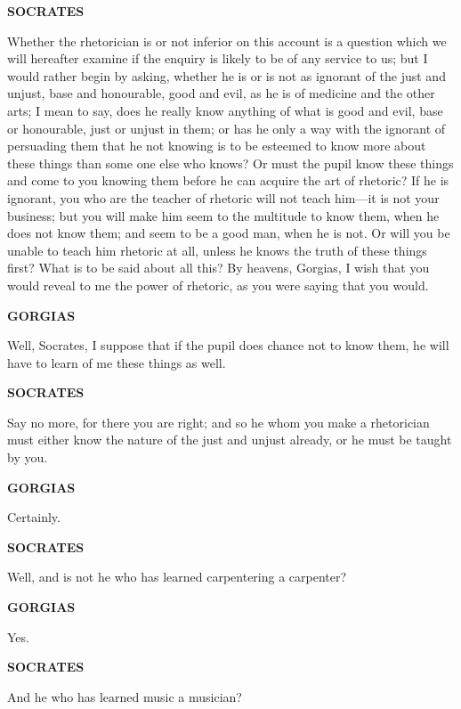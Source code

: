 \documentclass[11pt,letter]{article}
\begin{document}
\par \textbf{SOCRATES}
\par   Whether the rhetorician is or not inferior on this account is a question which we will hereafter examine if the enquiry is likely to be of any service to us; but I would rather begin by asking, whether he is or is not as ignorant of the just and unjust, base and honourable, good and evil, as he is of medicine and the other arts; I mean to say, does he really know anything of what is good and evil, base or honourable, just or unjust in them; or has he only a way with the ignorant of persuading them that he not knowing is to be esteemed to know more about these things than some one else who knows? Or must the pupil know these things and come to you knowing them before he can acquire the art of rhetoric? If he is ignorant, you who are the teacher of rhetoric will not teach him—it is not your business; but you will make him seem to the multitude to know them, when he does not know them; and seem to be a good man, when he is not. Or will you be unable to teach him rhetoric at all, unless he knows the truth of these things first? What is to be said about all this? By heavens, Gorgias, I wish that you would reveal to me the power of rhetoric, as you were saying that you would.

\par \textbf{GORGIAS}
\par   Well, Socrates, I suppose that if the pupil does chance not to know them, he will have to learn of me these things as well.

\par \textbf{SOCRATES}
\par   Say no more, for there you are right; and so he whom you make a rhetorician must either know the nature of the just and unjust already, or he must be taught by you.

\par \textbf{GORGIAS}
\par   Certainly.

\par \textbf{SOCRATES}
\par   Well, and is not he who has learned carpentering a carpenter?

\par \textbf{GORGIAS}
\par   Yes.

\par \textbf{SOCRATES}
\par   And he who has learned music a musician?
\end{document}
